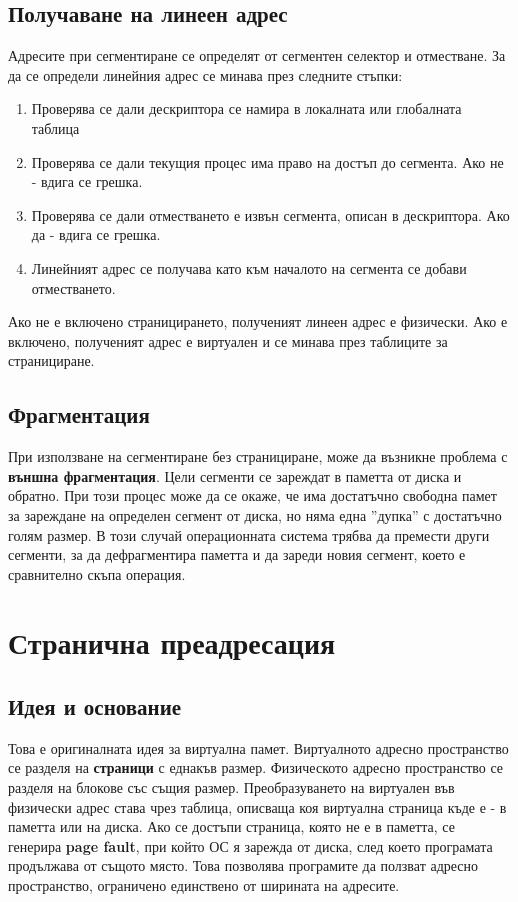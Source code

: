 \documentclass[fleqn,12pt]{article}
\begin{document}
\subsection{Получаване на линеен адрес}
Адресите при сегментиране се определят от сегментен селектор и отместване. За да се определи линейния адрес се минава през следните стъпки:
\begin{enumerate}
    \item Проверява се дали дескриптора се намира в локалната или глобалната таблица
    \item Проверява се дали текущия процес има право на достъп до сегмента. Ако не - вдига се грешка.
    \item Проверява се дали отместването е извън сегмента, описан в дескриптора. Ако да - вдига се грешка.
    \item Линейният адрес се получава като към началото на сегмента се добави отместването.
\end{enumerate}

Ако не е включено страницирането, полученият линеен адрес е физически. Ако е включено, полученият адрес е виртуален и се минава 
през таблиците за странициране.

\subsection{Фрагментация}
При използване на сегментиране без странициране, може да възникне проблема с \textbf{външна фрагментация}. 
Цели сегменти се зареждат в паметта от диска и обратно. При този процес може да се окаже, че има достатъчно свободна 
памет за зареждане на определен сегмент от диска, но няма една ''дупка'' с достатъчно голям размер. В този случай
операционната система трябва да премести други сегменти, за да дефрагментира паметта и да зареди новия сегмент,
което е сравнително скъпа операция.

\section{Странична преадресация}

\subsection{Идея и основание}
Това е оригиналната идея за виртуална памет. Виртуалното адресно пространство се разделя на \textbf{страници} с еднакъв размер.
Физическото адресно пространство се разделя на блокове със същия размер. Преобразуването на виртуален във физически адрес 
става чрез таблица, описваща коя виртуална страница къде е - в паметта или на диска. Ако се достъпи страница, която не 
е в паметта, се генерира \textbf{page fault}, при който ОС я зарежда от диска, след което програмата продължава от същото място.
Това позволява програмите да ползват адресно пространство, ограничено единствено от ширината на адресите.
\end{document}
